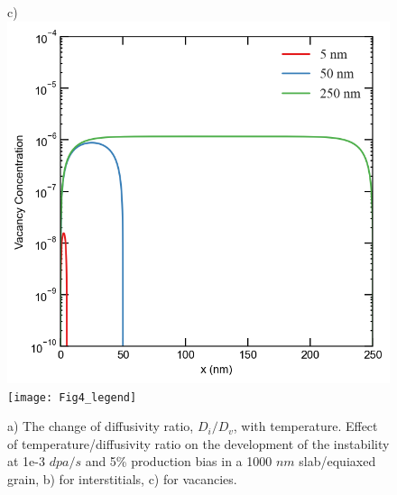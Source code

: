 \documentclass[utf8]{frontiersSCNS} %
\begin{document}
\begin{figure}[h!]
        c)\includegraphics[scale=0.35]{Fig4_c}
        \texttt{[image: Fig4\_legend]}
        \caption{a) The change of diffusivity ratio, $D_i/D_v$, with temperature. Effect of temperature/diffusivity ratio on the development of the instability at 1e-3 $dpa/s$ and 5\% production bias in a 1000 $nm$ slab/equiaxed grain, b) for interstitials, c) for vacancies.}
        \label{figure:concentrations_high_neutron_5_temperature}
    \end{figure}
    
\end{document}
